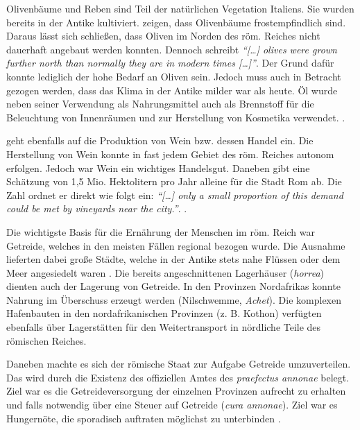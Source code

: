 \documentclass[
    a4paper,
    11pt,
    bibliography=totoc,
    listof=totoc,
    parskip=half,
    headings=normal
]{scrbook}
\begin{document}
Olivenbäume und Reben sind Teil der natürlichen Vegetation Italiens. Sie wurden bereits in der Antike kultiviert. \autocite{lodoliniComparisonFrostDamages2022} zeigen, dass Olivenbäume frostempfindlich sind. Daraus lässt sich schließen, dass Oliven im Norden des röm. Reiches nicht dauerhaft angebaut werden konnten. Dennoch schreibt \textcite[718]{harrisTrade1998} \textit{\enquote{[\dots] olives were grown further north than normally they are in modern times [\dots]}}. Der Grund dafür konnte lediglich der hohe Bedarf an Oliven sein. Jedoch muss auch in Betracht gezogen werden, dass das Klima in der Antike milder war als heute. Öl wurde neben seiner Verwendung als Nahrungsmittel auch als Brennstoff für die Beleuchtung von Innenräumen und zur Herstellung von Kosmetika verwendet. \autocite[717]{harrisTrade1998}.

\citeauthor{harrisTrade1998} geht ebenfalls auf die Produktion von Wein bzw. dessen Handel ein. Die Herstellung von Wein konnte in fast jedem Gebiet des röm. Reiches autonom erfolgen. Jedoch war Wein ein wichtiges Handelsgut. Daneben gibt \citeauthor{harrisTrade1998} eine Schätzung von 1,5 Mio. Hektolitern pro Jahr alleine für die Stadt Rom ab. Die Zahl ordnet er direkt wie folgt ein: \textit{\enquote{[\dots] only a small proportion of this demand could be met by vineyards near the city.}}. \autocite[720]{harrisTrade1998}.

Die wichtigste Basis für die Ernährung der Menschen im röm. Reich war Getreide, welches in den meisten Fällen regional bezogen wurde. Die Ausnahme lieferten dabei große Städte, welche in der Antike stets nahe Flüssen oder dem Meer angesiedelt waren \autocite[152\psq]{peacockPotteryRomanWorld1982}. Die bereits angeschnittenen Lagerhäuser (\textit{horrea}) dienten auch der Lagerung von Getreide. In den Provinzen Nordafrikas konnte Nahrung im Überschuss erzeugt werden (Nilschwemme, \textit{Achet}). Die komplexen Hafenbauten in den nordafrikanischen Provinzen (z. B. Kothon) verfügten ebenfalls über Lagerstätten für den Weitertransport in nördliche Teile des römischen Reiches.

Daneben machte es sich der römische Staat zur Aufgabe Getreide umzuverteilen. Das wird durch die Existenz des offiziellen Amtes des \textit{praefectus annonae} \autocite[vgl.][243]{eckGROWTHADMINISTRATIVEPOSTS1998} belegt. Ziel war es die Getreideversorgung der einzelnen Provinzen aufrecht zu erhalten und falls notwendig über eine Steuer auf Getreide (\textit{cura annonae}). Ziel war es Hungernöte, die sporadisch auftraten möglichst zu unterbinden \autocite[794]{frierDemography1998}.
\end{document}
